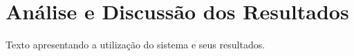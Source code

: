 \chapter{Análise e Discussão dos Resultados}
\label{cap:04}

Texto apresentando a utilização do sistema e seus resultados.